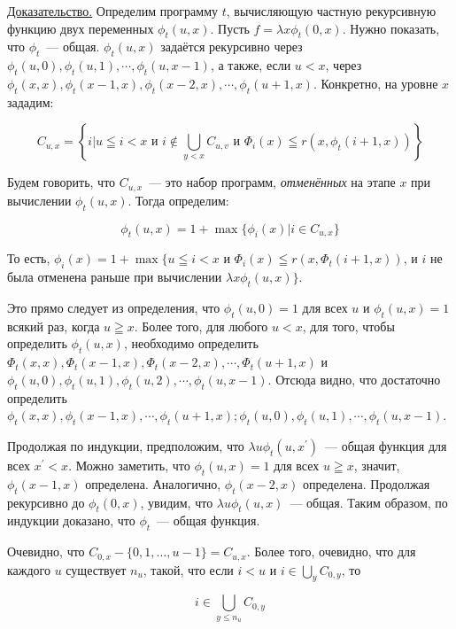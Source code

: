 \documentclass[a4paper,12pt]{report}
\begin{document}
\underline{Доказательство.} Определим программу $t$, вычисляющую частную рекурсивную функцию двух переменных $\phi_t(u, x)$. Пусть $f = \lambda x \phi_t(0, x)$. Нужно показать, что $\phi_t$~--- общая. $\phi_t(u, x)$ задаётся рекурсивно через $\phi_t(u, 0), \phi_t(u, 1), \cdots , \phi_t(u, x-1)$, а также, если $u < x$, через $\phi_t(x, x), \phi_t(x-1, x), \phi_t(x-2, x), \cdots , \phi_t(u+1, x)$. Конкретно, на уровне $x$ зададим:

\begin{equation}
C_{u,x} = \left\{ i | u \leqq i < x \mbox{ и } i \notin \bigcup_{y<x} C_{u,v} \mbox{ и } \Phi_i(x) \leqq r(x, \phi_t(i+1, x)) \right\}
\end{equation}

Будем говорить, что $C_{u,x}$~--- это набор программ, \textit{отменённых} на этапе $x$ при вычислении $\phi_t(u, x)$. Тогда определим:

\begin{equation}
\phi_t(u,x) = 1 + \max\{\phi_i(x) | i \in C_{u,x}\}
\end{equation}

То есть, $\phi_i(x) = 1 + \max\{u \leqq i < x \mbox{ и } \Phi_i(x) \leqq r(x, \Phi_t(i+1, x))$, и $i$ не была отменена раньше при вычислении $\lambda x \phi_t(u, x)\}$.

Это прямо следует из определения, что $\phi_t(u,0) = 1$ для всех $u$ и $\phi_t(u, x) = 1$ всякий раз, когда $u \geqq x$. Более того, для любого $u < x$, для того, чтобы определить $\phi_t(u, x)$, необходимо определить $\Phi_t(x, x), \Phi_t(x-1, x), \Phi_t(x-2, x), \cdots , \Phi_t(u+1, x)$ и $\phi_t(u, 0), \phi_t(u, 1), \phi_t(u, 2), \cdots , \phi_t(u,x-1)$. Отсюда видно, что достаточно определить $\phi_t(x, x), \phi_t(x-1, x), \cdots , \phi_t(u+1, x) ; \phi_t(u, 0), \phi_t(u, 1), \cdots , \phi_t(u, x-1)$.

Продолжая по индукции, предположим, что $\lambda u \phi_t(u, x^{'})$~--- общая функция для всех $x^{'} < x$. Можно заметить, что $\phi_t(u, x) = 1$ для всех $u \geqq x$, значит, $\phi_t(x-1, x)$ определена. Аналогично, $\phi_t(x-2, x)$ определена. Продолжая рекурсивно до $\phi_t(0, x)$, увидим, что $\lambda u \phi_t(u, x)$~--- общая. Таким образом, по индукции доказано, что $\phi_t$~--- общая функция.

Очевидно, что $C_{0,x} - \{0, 1, \dots , u-1\} = C_{u,x}$. Более того, очевидно, что для каждого $u$ существует $n_u$, такой, что если $i < u$ и $i \in \bigcup_y C_{0,y}$, то

\begin{equation}
i \in \bigcup_{y \le n_u} C_{0,y}
\end{equation}
\end{document}
